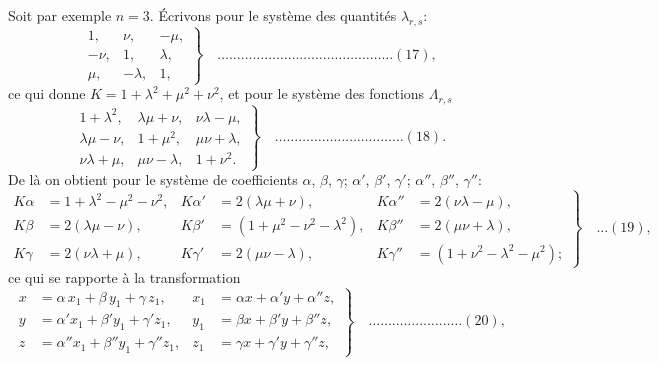 \documentclass[11pt,a4paper]{book}
\begin{document}
Soit par exemple $n = 3$. \'Ecrivons pour le syst\`eme des quantit\'es $\lambda_{r,s}$:
\[
\left. \begin{array}{rrr}
1, & \nu, & -\mu, \\
-\nu, & 1, & \lambda, \\
\mu, & -\lambda, & 1,
\end{array} \right\} \quad \ldots \ldots \ldots \ldots \ldots \ldots \ldots \ldots \ldots \ldots \ldots \ldots \ldots \ldots \ldots (17),
\]
ce qui donne $K = 1 + \lambda^2 + \mu^2 + \nu^2$, et pour le syst\`eme des fonctions $\Lambda_{r,s}$
\[
\left. \begin{array}{ccc}
1 + \lambda^2, & \lambda\mu + \nu, & \nu\lambda - \mu, \\
\lambda\mu - \nu, & 1 + \mu^2, & \mu\nu + \lambda, \\
\nu\lambda + \mu, & \mu\nu - \lambda, & 1 + \nu^2.
\end{array} \right\} \quad \ldots \ldots \ldots \ldots \ldots \ldots \ldots \ldots \ldots \ldots \ldots (18).
\]
De l\`a on obtient pour le syst\`eme de coefficients $\alpha$, $\beta$, $\gamma$; $\alpha'$, $\beta'$, $\gamma'$; $\alpha''$, $\beta''$, $\gamma''$:
\[
\left. \begin{aligned}
K\alpha &= 1 + \lambda^2 - \mu^2 - \nu^2, & K\alpha' &= 2(\lambda\mu + \nu), & K\alpha'' &= 2(\nu\lambda - \mu), \\
K\beta &= 2(\lambda\mu - \nu), & K\beta' &= (1 + \mu^2 - \nu^2 - \lambda^2), & K\beta'' &= 2(\mu\nu + \lambda), \\
K\gamma &= 2(\nu\lambda + \mu), & K\gamma' &= 2(\mu\nu - \lambda), & K\gamma'' &= (1 + \nu^2 - \lambda^2 - \mu^2);
\end{aligned} \right\} \quad \ldots (19),
\]
ce qui se rapporte \`a la transformation
\[
\left. \begin{aligned}
x &= \alpha\, x_1 + \beta\, y_1 + \gamma\, z_1, & x_1 &= \alpha x + \alpha' y + \alpha'' z, \\
y &= \alpha' x_1 + \beta' y_1 + \gamma' z_1, & y_1 &= \beta x + \beta' y + \beta'' z, \\
z &= \alpha'' x_1 + \beta'' y_1 + \gamma'' z_1, & z_1 &= \gamma x + \gamma' y + \gamma'' z,
\end{aligned} \right\} \quad \ldots \ldots \ldots \ldots \ldots \ldots \ldots \ldots (20),
\]
\end{document}
